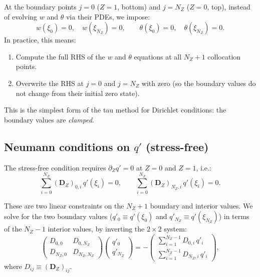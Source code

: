 \documentclass[11pt]{article}
\newcommand{\Dvec}{\bm{D}}
\begin{document}
At the boundary points $j = 0$ ($Z = 1$, bottom) and $j = N_Z$ ($Z = 0$, top), instead of evolving $w$ and $\theta$ via their PDEs, we impose:
\begin{equation}
w(\xi_0) = 0, \quad w(\xi_{N_Z}) = 0, \qquad \theta(\xi_0) = 0, \quad \theta(\xi_{N_Z}) = 0.
\end{equation}
In practice, this means:
\begin{enumerate}[nosep]
\item Compute the full RHS of the $w$ and $\theta$ equations at all $N_Z + 1$ collocation points.
\item Overwrite the RHS at $j = 0$ and $j = N_Z$ with zero (so the boundary values do not change from their initial zero state).
\end{enumerate}
This is the simplest form of the tau method for Dirichlet conditions: the boundary values are \emph{clamped}.

\subsection{Neumann conditions on $q'$ (stress-free)}
\label{sec:neumann_tau}

The stress-free condition requires $\partial_Z q' = 0$ at $Z = 0$ and $Z = 1$, i.e.:
\begin{equation}
\sum_{i=0}^{N_Z} (\Dvec_Z)_{0,i}\, q'(\xi_i) = 0, \qquad
\sum_{i=0}^{N_Z} (\Dvec_Z)_{N_Z,i}\, q'(\xi_i) = 0.
\label{eq:neumann_collocation}
\end{equation}

These are two linear constraints on the $N_Z + 1$ boundary and interior values. We solve for the two boundary values ($q'_0 \equiv q'(\xi_0)$ and $q'_{N_Z} \equiv q'(\xi_{N_Z})$) in terms of the $N_Z - 1$ interior values, by inverting the $2 \times 2$ system:
\begin{equation}
\begin{pmatrix}
D_{0,0} & D_{0,N_Z} \\
D_{N_Z,0} & D_{N_Z,N_Z}
\end{pmatrix}
\begin{pmatrix}
q'_0 \\ q'_{N_Z}
\end{pmatrix}
= -
\begin{pmatrix}
\sum_{i=1}^{N_Z-1} D_{0,i}\, q'_i \\[4pt]
\sum_{i=1}^{N_Z-1} D_{N_Z,i}\, q'_i
\end{pmatrix},
\label{eq:neumann_2x2}
\end{equation}
where $D_{ij} \equiv (\Dvec_Z)_{ij}$.
\end{document}
